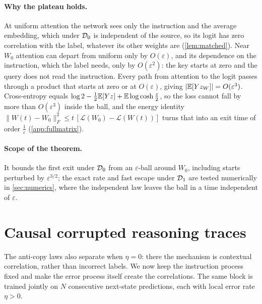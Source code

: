 \paragraph{Why the plateau holds.} At uniform attention the network sees only the instruction and the average embedding, which under $\mathcal D_{0}$ is independent of the source, so
its logit has zero correlation with the label, whatever its other weights are (\cref{lem:matched}). Near $W_0$ attention can depart from uniform only by $O(\varepsilon)$,
and its dependence on the instruction, which the label needs, only by $O(\varepsilon^2)$: the key starts at zero and the query does not read the instruction.
Every path from attention to the logit passes through a product that starts at zero or at $O(\varepsilon)$, giving $|\mathbb E[Yz_W]|=O(\varepsilon^3)$.
Cross-entropy equals $\log2-\tfrac12\mathbb E[Yz]+\mathbb E\log\cosh\tfrac{z}{2}$, so the loss cannot fall by more than $O(\varepsilon^3)$ inside the ball, and the energy identity
$\|W(t)-W_0\|_F^2\le t\,[\mathcal L(W_0)-\mathcal L(W(t))]$ turns that into an exit time of order $\tfrac{1}{\varepsilon}$ (\cref{app:fullmatrix}).

\paragraph{Scope of the theorem.} It bounds the first exit under $\mathcal D_{0}$ from an $\varepsilon$-ball around $W_0$, including starts perturbed by $\varepsilon^{3/2}$;
the exact rate and fast escape under $\mathcal D_{1}$ are tested numerically in \cref{sec:numerics}, where the independent law leaves the ball in a time independent of $\varepsilon$.

\section{Causal corrupted reasoning traces}
\label{sec:causal}
The anti-copy laws also separate when $\eta=0$: there the mechanism is contextual correlation, rather than incorrect labels.
We now keep the instruction process fixed and make the error process itself create the correlations.
The same block is trained jointly on $N$ consecutive next-state predictions, each with local error rate $\eta>0$.


